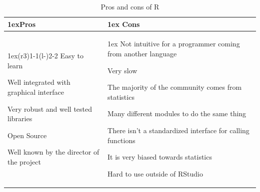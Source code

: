 \documentclass{article}
\begin{document}
        \begin{table}[H]
        \begin{tabularx}{\linewidth}{>{\parskip1ex}X@{\kern4\tabcolsep}>{\parskip1ex}X}
        \toprule
        \hfil\bfseries Pros
        &
        \hfil\bfseries Cons
        \\\cmidrule(r{3\tabcolsep}){1-1}\cmidrule(l{-\tabcolsep}){2-2}
        Easy to learn\par
        Well integrated with graphical interface\par
        Very robust and well tested libraries\par
        Open Source\par
        Well known by the director of the project\par
        &
        Not intuitive for a programmer coming from another language\par
        Very slow\par
        The majority of the community comes from statistics\par
        Many different modules to do the same thing\par
        There isn't a standardized interface for calling functions\par
        It is very biased towards statistics\par
        Hard to use outside of RStudio\par
        \\\bottomrule
        \end{tabularx}
        \caption{Pros and cons of R}
        \end{table}
\end{document}
